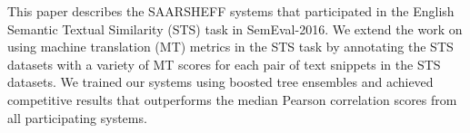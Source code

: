 This paper describes the SAARSHEFF systems that participated in the English Semantic Textual Similarity (STS) task in SemEval-2016. We extend the work on using machine translation (MT) metrics in the STS task by annotating the STS datasets with a variety of MT scores for each pair of text snippets in the STS datasets. We trained our systems using boosted tree ensembles and achieved competitive results that outperforms the median Pearson correlation scores from all participating systems.
